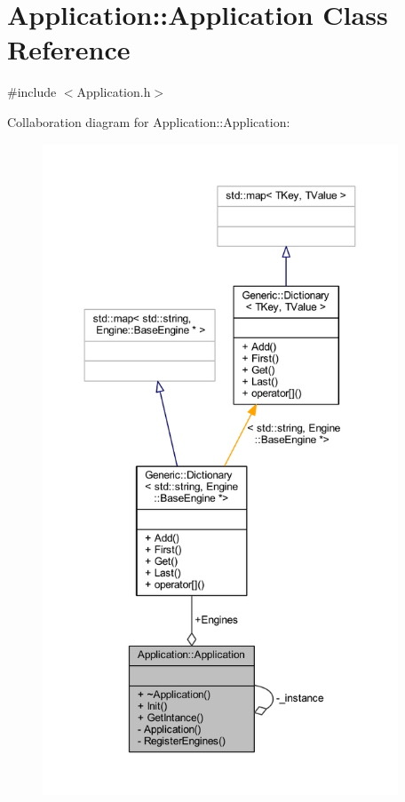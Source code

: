 \hypertarget{classApplication_1_1Application}{}\section{Application\+:\+:Application Class Reference}
\label{classApplication_1_1Application}


{\ttfamily \#include $<$Application.\+h$>$}



Collaboration diagram for Application\+:\+:Application\+:
\nopagebreak
\begin{figure}[H]
\begin{center}
\leavevmode
\includegraphics[height=550pt]{classApplication_1_1Application__coll__graph}
\end{center}
\end{figure}
